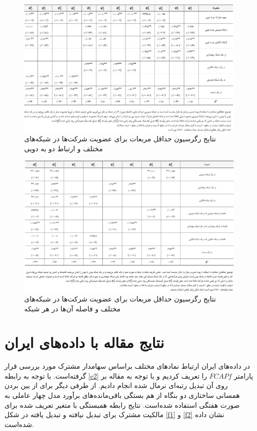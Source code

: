 \documentclass[12pt]{article}
\begin{document}
\begin{landscape}
\begin{figure}
\centering
\includegraphics[width=\columnwidth]{Table2.png}
\caption{نتایج رگرسیون حداقل مربعات برای عضویت شرکت‌ها در شبکه‌های مختلف و ارتباط دو به دویی}
\label{g2}
\end{figure}
\begin{figure}
\centering
\includegraphics[width=\columnwidth]{Table3.png}
\caption{نتایج رگرسیون حداقل مربعات برای عضویت شرکت‌ها در شبکه‌های مختلف و فاصله آن‌ها در هر شبکه}
\label{g3}
\end{figure}
\end{landscape}

\section{نتایج مقاله با داده‌های ایران}
در داده‌های ایران ارتباط نماد‌های مختلف براساس سهامدار مشترک مورد بررسی قرار گرفته‌است. با توجه به رابطه 
\ref{e2}
پارامتر 
$ FCAPf $ 
را تعریف کردیم و با توجه به مقاله بر روی آن تبدیل رتبه‌ای نرمال شده انجام دادیم. از طرفی دیگر برای از بین بردن همسانی ساختاری دو بنگاه از هم بستگی باقی‌مانده‌های برآورد مدل چهار عاملی به صورت هفتگی استفاده شده‌است. نتایج  رابطه همبستگی با متغیر تعریف شده برای مالکیت مشترک برای تبدیل نیافته و تبدیل یافته در شکل 
\ref{f1} 
و 
\ref{f2}
نشان داده شده‌است.
 
\end{document}
